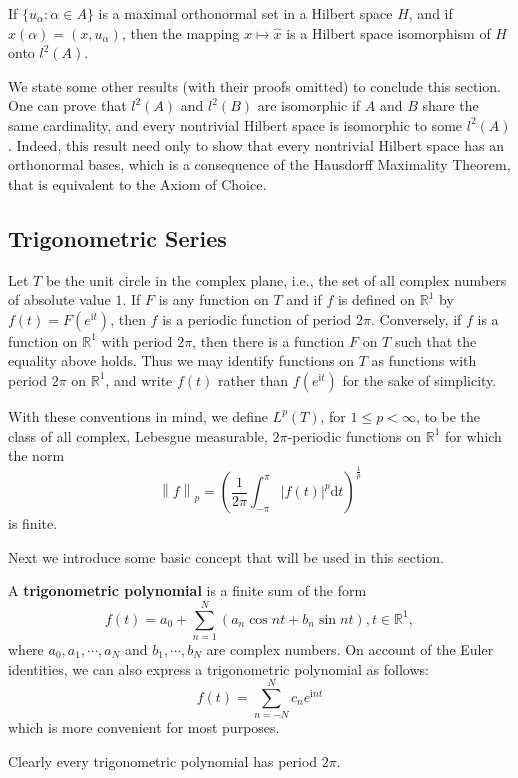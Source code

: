 \begin{theorem}
If $\{u_\alpha:\alpha\in A\}$ is a maximal orthonormal set in a Hilbert space $H$, and if $\widehat{x}(\alpha)=(x,u_\alpha)$, then the mapping $x\mapsto\widehat{x}$ is a Hilbert space isomorphism of $H$ onto $l^2(A)$.
\end{theorem}
We state some other results (with their proofs omitted) to conclude this section. One can prove that $l^2(A)$ and $l^2(B)$ are isomorphic if $A$ and $B$ share the same cardinality, and every nontrivial Hilbert space is isomorphic to some $l^2(A)$. Indeed, this result need only to show that every nontrivial Hilbert space has an orthonormal bases, which is a consequence of the Hausdorff Maximality Theorem, that is equivalent to the Axiom of Choice.
\subsection{Trigonometric Series}
Let $T$ be the unit circle in the complex plane, i.e., the set of all complex numbers of absolute value $1$. If $F$ is any function on $T$ and if $f$ is defined on $\mathbb{R}^1$ by $f(t)=F(e^{\mathrm{i}t})$, then $f$ is a periodic function of period $2\pi$. Conversely, if $f$ is a function on $\mathbb{R}^1$ with period $2\pi$, then there is a function $F$ on $T$ such that the equality above holds. Thus we may identify functions on $T$ as functions with period $2\pi$ on $\mathbb{R}^1$, and write $f(t)$ rather than $f(e^{\mathrm{i}t})$ for the sake of simplicity.\par
With these conventions in mind, we define $L^p(T)$, for $1\le p<\infty$, to be the class of all complex, Lebesgue measurable, $2\pi$-periodic functions on $\mathbb{R}^1$ for which the norm 
$$
\left\| f \right\| _p=\left( \frac{1}{2\pi}\int_{-\pi}^{\pi}{\left| f\left( t \right) \right|^p\mathrm{d}t} \right) ^{\frac{1}{p}}
$$
is finite.\par
Next we introduce some basic concept that will be used in this section.
\begin{definition}
A \textbf{trigonometric polynomial} is a finite sum of the form 
$$
f\left( t \right) =a_0+\sum_{n=1}^N{\left( a_n\cos nt+b_n\sin nt \right)},t\in \mathbb{R} ^1,
$$
where $a_0,a_1,\cdots,a_N$ and $b_1,\cdots,b_N$ are complex numbers. On account of the Euler identities, we can also express a trigonometric polynomial as follows:
$$
f\left( t \right) =\sum_{n=-N}^N{c_ne^{\mathrm{i}nt}}
$$
which is more convenient for most purposes.
\end{definition}
Clearly every trigonometric polynomial has period $2\pi$.\par
